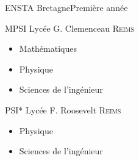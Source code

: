 \begin{frame}{ENSTA Bretagne}{Première année}
    \begin{minipage}{0.25\textwidth}
    \end{minipage}
    \hfill
    \begin{minipage}{0.5\textwidth}
        \begin{block}{MPSI Lycée G. Clemenceau \textsc{Reims}}
            \begin{itemize}
                \item Mathématiques \\
                \item Physique \\
                \item Sciences de l'ingénieur
            \end{itemize}
        \end{block}
        \begin{block}{PSI* Lycée F. Roosevelt \textsc{Reims}}
            \begin{itemize}
                \item Physique \\
                \item Sciences de l'ingénieur
            \end{itemize}
        \end{block}
    \end{minipage}
    \hfill
    \begin{minipage}{0.25\textwidth}
    \end{minipage}
\end{frame}
